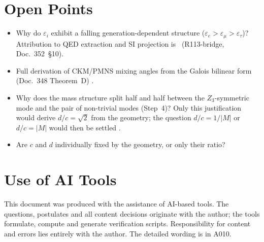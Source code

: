 \section{Open Points}

\begin{itemize}
  \item Why do $\varepsilon_i$ exhibit a falling generation-dependent structure
    ($\varepsilon_e > \varepsilon_\mu > \varepsilon_\tau$)?
    Attribution to QED extraction and SI projection is \SM\ (R113-bridge,
    Doc.~352~\S10).
  \item Full derivation of CKM/PMNS mixing angles from the Galois bilinear
    form (Doc.~348 Theorem~D) \SM.
  \item Why does the mass structure split half and half between the
    $Z_3$-symmetric mode and the pair of non-trivial modes (Step~4)? Only this
    justification would derive $d/c = \sqrt{2}$ from the geometry; the question
    $d/c = 1/|M|$ or $d/c = |M|$ would then be settled \SM.
  \item Are $c$ and $d$ individually fixed by the geometry, or only their
    ratio? \SM
\end{itemize}

\section{Use of AI Tools}

This document was produced with the assistance of AI-based tools.
The questions, postulates and all content decisions originate with the author;
the tools formulate, compute and generate verification scripts.
Responsibility for content and errors lies entirely with the author.
The detailed wording is in A010.
